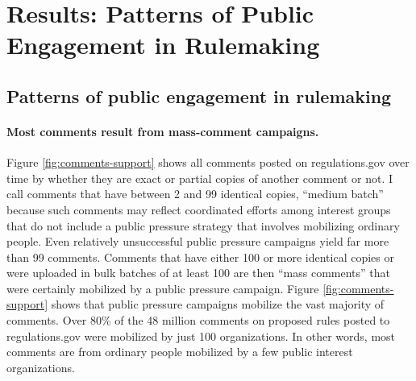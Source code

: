 \documentclass[
      12pt,
        ]{article}
\begin{document}
\hypertarget{whyMail-results}{%
\section{Results: Patterns of Public Engagement in Rulemaking}\label{whyMail-results}}

\hypertarget{patterns-of-public-engagement-in-rulemaking}{%
\subsection{Patterns of public engagement in rulemaking}\label{patterns-of-public-engagement-in-rulemaking}}

\hypertarget{most-comments-result-from-mass-comment-campaigns.}{%
\paragraph{Most comments result from mass-comment campaigns.}\label{most-comments-result-from-mass-comment-campaigns.}}

Figure
\ref{fig:comments-support} shows all comments posted on
regulations.gov over time by whether they are exact or partial copies of
another comment or not. I call comments that have between 2 and 99
identical copies, ``medium batch'' because such comments may reflect
coordinated efforts among interest groups that do not include a public
pressure strategy that involves mobilizing ordinary people. Even relatively unsuccessful public pressure campaigns yield far more than 99 comments. Comments that have either 100 or more identical copies or were uploaded in bulk batches of at least 100 are then ``mass comments'' that were certainly mobilized by a public pressure campaign. Figure \ref{fig:comments-support} shows that public pressure campaigns mobilize the vast majority of comments. Over 80\% of the 48 million comments on proposed rules posted to regulations.gov were mobilized by just 100 organizations. In other words, most comments are from ordinary people mobilized by a few public interest organizations.
\end{document}

